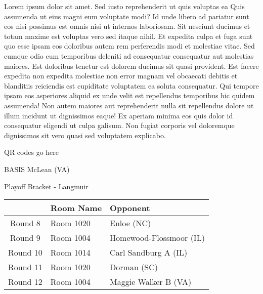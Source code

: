 \documentclass{article}%
\begin{document}
\vspace*{8pt}%
\linebreak%
\newline%
\newline%
Lorem ipsum dolor sit amet. Sed iusto reprehenderit ut quis voluptas ea Quis assumenda ut eius magni eum voluptate modi? Id unde libero ad pariatur sunt eos nisi possimus est omnis nisi ut internos laboriosam. Sit nesciunt ducimus et totam maxime est voluptas vero sed itaque nihil. Et expedita culpa et fuga sunt quo esse ipsam eos doloribus autem rem perferendis modi et molestiae vitae.\newline%
\newline%
Sed cumque odio eum temporibus deleniti ad consequatur consequatur aut molestias maiores. Est doloribus tenetur est dolorem ducimus sit quasi provident. Est facere expedita non expedita molestiae non error magnam vel obcaecati debitis et blanditiis reiciendis est cupiditate voluptatem ea soluta consequatur. Qui tempore ipsam eos asperiores aliquid ex unde velit est repellendus temporibus hic quidem assumenda!\newline%
\newline%
Non autem maiores aut reprehenderit nulla sit repellendus dolore ut illum incidunt ut dignissimos eaque! Ex aperiam minima eos quis dolor id consequatur eligendi ut culpa galisum. Non fugiat corporis vel doloremque dignissimos sit vero quasi sed voluptatem explicabo.\newline%
\newline%
%
\vspace*{30pt}%
\begin{center}%
\begin{Huge}%
QR codes go here%
\end{Huge}%
\end{center}%
\newpage%
\begin{center}%
\begin{Huge}%
BASIS McLean (VA)%
\end{Huge}%
\vspace*{8pt}%
\linebreak%
\begin{Large}%
Playoff Bracket {-} Langmuir%
\end{Large}%
\end{center}%
%
\begin{tabularx}{\textwidth}{|c|Y|Y|}%
\hline%
&Room Name&Opponent\\%
\hline%
Round 8&Room 1020&Enloe (NC)\\%
Round 9&Room 1004&Homewood{-}Flossmoor (IL)\\%
Round 10&Room 1014&Carl Sandburg A (IL)\\%
Round 11&Room 1020&Dorman (SC)\\%
Round 12&Room 1004&Maggie Walker B (VA)\\%
\hline%
\end{tabularx}%
\end{document}
